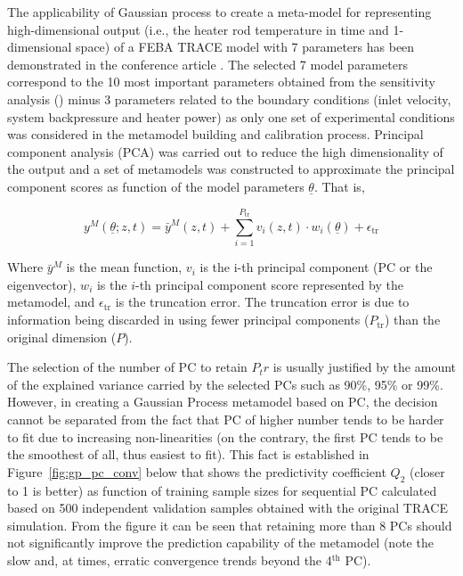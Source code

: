 \documentclass[11pt,titlepage]{article}
\begin{document}
The applicability of Gaussian process to create a meta-model for representing 
high-dimensional output (i.e., the heater rod temperature in time and 
1-dimensional space) of a FEBA TRACE model with 7 parameters has been
demonstrated in the conference article \cite{Wicaksono2016}. 
The selected 7 model parameters correspond to the 10 most important parameters
obtained from the sensitivity analysis (\cite{Wicaksono2016}) minus 3 
parameters related to the boundary conditions (inlet velocity, system 
backpressure and heater power) as only one set of experimental conditions 
was considered in the metamodel building and calibration process.
Principal component analysis (PCA) was carried out to reduce the 
high dimensionality of the output and a set of metamodels was constructed to 
approximate the principal component scores as function of the model parameters 
$\underline{\theta}$. 
That is,

\begin{equation}
	y^M(\underline{\theta};z,t) = \bar{y}^M(z,t) + \sum_{i=1}^{P_\text{tr}} v_i(z,t) \cdot w_i(\underline{\theta}) + \epsilon_\text{tr}
\end{equation}

Where $\bar{y}^M$  is the mean function, $v_i$ is the i-th principal component 
(PC or the eigenvector), $w_i$ is the $i$-th principal component score 
represented by the metamodel, and $\epsilon_\text{tr}$ is the truncation 
error. The truncation error is due to information being discarded in using fewer 
principal components ($P_\text{tr}$) than the original dimension ($P$).

The selection of the number of PC to retain $P_tr$ is usually justified by 
the amount of the explained variance carried by the selected PCs 
such as 90\%, 95\% or 99\%. 
However, in creating a Gaussian Process metamodel based on PC, the 
decision cannot be separated from the fact that PC of higher number 
tends to be harder to fit due to increasing non-linearities 
(on the contrary, the first PC tends to be the smoothest of all, 
thus easiest to fit). 
This fact is established in Figure~\ref{fig:gp_pc_conv} below that shows the 
predictivity coefficient $Q_2$ (closer to 1 is better) as function of 
training sample sizes for sequential PC calculated based on 500 independent 
validation samples obtained with the original TRACE simulation. 
From the figure it can be seen that retaining more than 
8 PCs should not significantly improve the prediction capability of 
the metamodel (note the slow and, at times, erratic convergence trends 
beyond the 4$^{\text{th}}$ PC).
\end{document}
